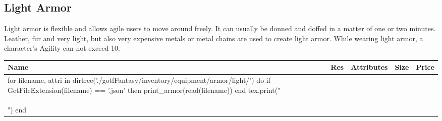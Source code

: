 \subsection{Light Armor}\label{subsec:lightArmor}
Light armor is flexible and allows agile users to move around freely.
It can usually be donned and doffed in a matter of one or two minutes.
Leather, fur and very light, but also very expensive metals or metal chains are used to create light armor.
While wearing light armor, a character's Agility can not exceed 10.

\begin{longtable}{p{3.5cm} | p{1.5cm} | p{5cm} | p{1cm} | p{1.25cm}}
	Name & Res &  Attributes & Size & Price\\ \hline
	\luadirect{
		for filename, attri in dirtree('./gotfFantasy/inventory/equipment/armor/light/')
		do
			if GetFileExtension(filename) == '.json'
			then
				print_armor(read(filename))
			end
			tex.print("\\\\")
		end
	}
\end{longtable}